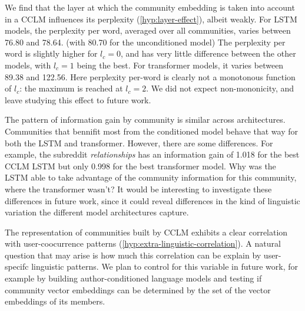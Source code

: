 \documentclass[11pt,a4paper]{article}
\newcommand\bn[1]{\todo[backgroundcolor=green!10]{BN: #1}}
\begin{document}
We find that the layer at which the community embedding is taken into
account in a CCLM influences its perplexity (\cref{hyp:layer-effect}),
albeit weakly. For LSTM models, the perplexity per word, averaged over
all communities, varies between 76.80 and 78.64. (with 80.70 for the unconditioned model)
The perplexity per word is slightly higher for $l_c=0$, and has very
little difference between the other models, with $l_c=1$ being the best.
For transformer models, it varies
between 89.38 and 122.56. Here perplexity per-word is clearly not a monotonous
function of $l_c$: the maximum is reached at $l_c=2$. We did not
expect non-mononicity, and leave studying this effect to future work.

The pattern of information gain by community is similar across architectures.
Communities that bennifit most from the conditioned model behave that way for 
both the LSTM and transformer.
However, there are some differences.
For example, the subreddit \emph{relationships} has an information gain of \num{1.018} for
the best CCLM LSTM but only \num{0.998} for the best transformer model. \bn{todo: community-wise CCLM info gain}
Why was the LSTM able to take advantage of the community information for
this community, where the transformer wasn't?
It would be interesting to investigate these differences in future work,
since it could reveal differences in the kind of linguistic variation the different
model architectures capture.

The representation of communities built by CCLM exhibits a clear
correlation with user-coocurrence patterns
(\cref{hyp:extra-linguistic-correlation}). A natural
question that may arise is how much this correlation can be explain by
user-specifc linguistic patterns. We plan to control for this variable
in future work, for example by building author-conditioned language
models and testing if community vector embeddings can be determined by
the set of the vector embeddings of its members.



\end{document}
